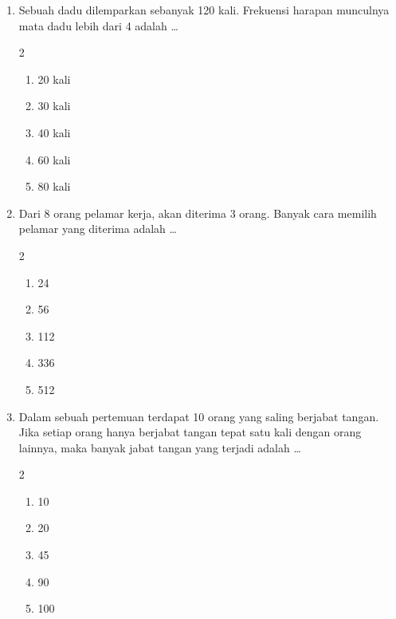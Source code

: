 \documentclass[12pt,a4paper]{article}
\begin{document}
\begin{enumerate}[itemsep=2ex]
    \item Sebuah dadu dilemparkan sebanyak 120 kali. Frekuensi harapan munculnya mata dadu lebih dari 4 adalah \dots
    \begin{multicols}{2}
    \begin{enumerate}[label=\Alph*.]
        \item 20 kali
        \item 30 kali
        \item 40 kali
        \item 60 kali
        \item 80 kali
    \end{enumerate}
    \end{multicols}

    \item Dari 8 orang pelamar kerja, akan diterima 3 orang. Banyak cara memilih pelamar yang diterima adalah \dots
    \begin{multicols}{2}
    \begin{enumerate}[label=\Alph*.]
        \item 24
        \item 56
        \item 112
        \item 336
        \item 512
    \end{enumerate}
    \end{multicols}

    \item Dalam sebuah pertemuan terdapat 10 orang yang saling berjabat tangan. Jika setiap orang hanya berjabat tangan tepat satu kali dengan orang lainnya, maka banyak jabat tangan yang terjadi adalah \dots
    \begin{multicols}{2}
    \begin{enumerate}[label=\Alph*.]
        \item 10
        \item 20
        \item 45
        \item 90
        \item 100
    \end{enumerate}
    \end{multicols}

\end{enumerate}
\end{document}
